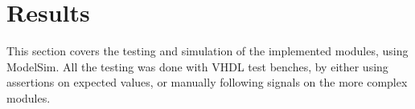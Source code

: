 \section{Results}\label{chapter:Results}
This section covers the testing and simulation of the implemented
modules, using ModelSim. All the testing was done with VHDL
test benches, by either using assertions on expected values, or 
manually following signals on the more complex modules.




